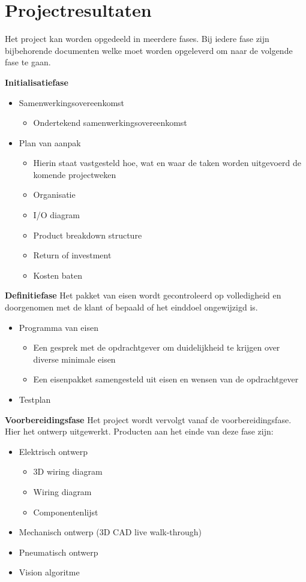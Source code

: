 
\section{Projectresultaten}
Het project kan worden opgedeeld in meerdere fases. Bij iedere fase zijn bijbehorende documenten welke moet worden opgeleverd om naar de volgende fase te gaan. 
\vspace{5mm}

\textbf{Initialisatiefase}


\begin{itemize}
	\item Samenwerkingsovereenkomst
	\begin{itemize}
		\item Ondertekend samenwerkingsovereenkomst
	\end{itemize}
	\item Plan van aanpak
	\begin{itemize}
		\item Hierin staat vastgesteld hoe, wat en waar de taken worden uitgevoerd de komende projectweken
		\item Organisatie
		\item I/O diagram
		\item Product breakdown structure
		\item Return of investment
		\item Kosten baten
	\end{itemize}
\end{itemize}


\textbf{Definitiefase}
Het pakket van eisen wordt gecontroleerd op volledigheid en doorgenomen met de klant of bepaald of het einddoel ongewijzigd is. 

\begin{itemize}
	\item Programma van eisen
	\begin{itemize}
		\item Een gesprek met de opdrachtgever om duidelijkheid te krijgen over diverse minimale eisen
		\item Een eisenpakket samengesteld uit eisen en wensen van de opdrachtgever
	\end{itemize}
	\item Testplan
\end{itemize}

\textbf{Voorbereidingsfase}
Het project wordt vervolgt vanaf de voorbereidingsfase. Hier het ontwerp uitgewerkt. Producten aan het einde van deze fase zijn:
\begin{itemize}
	\item Elektrisch ontwerp
	\begin{itemize}
		\item 3D wiring diagram
		\item Wiring diagram
		\item Componentenlijst
	\end{itemize}
	\item Mechanisch ontwerp (3D CAD live walk-through)
	\item Pneumatisch ontwerp
	\item Vision algoritme
\end{itemize}

